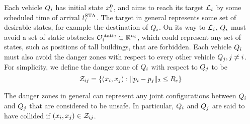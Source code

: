 

Each vehicle $Q_i$ has initial state $x^0_i$, and aims to reach its target $\mathcal{L}_i$ by some scheduled time of arrival $t^\text{STA}_i$. The target in general represents some set of desirable states, for example the destination of $Q_i$. %
On its way to $\mathcal{L}_i$, $Q_i$ must avoid a set of static obstacles $\mathcal{O}^\text{static}_i \subset \mathbb{R}^{n_i}$, which could represent any set of states, such as positions of tall buildings, that are forbidden. Each vehicle $Q_i$ must also avoid the danger zones with respect to every other vehicle $Q_j, j\neq i$. For simplicity, we define the danger zone of $Q_i$ with respect to $Q_j$ to be
\begin{equation} \label{eqn:danger_zone_defn}
\dz_{ij} = \{(\state_i, \state_j): \|\pos_i - \pos_j\|_2 \le \rc\}
\end{equation}

The danger zones in general can represent any joint configurations between $Q_i$ and $Q_j$ that are considered to be unsafe. In particular, $Q_i$ and $Q_j$ are said to have collided if $(x_i, x_j) \in \mathcal{Z}_{ij}$.


